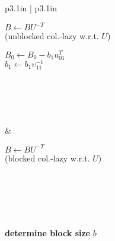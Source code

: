 \begin{figure}[htbp]
\begin{center}
\begin{tabular}{p{3.1in} | p{3.1in}}
\begin{minipage}{3.1in}
\begin{algorithm}{
\label{alg:unblocked_collazy_utrsm}
\begin{minipage}[t]{2in}
$ B \leftarrow B U^{-T} $ \\(unblocked col.-lazy w.r.t. $ U $)
\end{minipage}
}
\begin{minipage}{4in}
\begin{FlameAlgNarrow}
  $ B_0 \leftarrow B_0 -  b_{1} u_{01}^T $ \\
  $ b_{1} \leftarrow b_{1} \upsilon_{11}^{-1} $ \\
  
  \FlaEndCompute\\     %
   \\ 
   \\           %
\FlaEndDo \\       %
\end{FlameAlgNarrow}
\end{minipage}
\end{algorithm}
\end{minipage}
&
\begin{minipage}{3.1in}
\begin{algorithm}{
\label{alg:blocked_collazy_utrsm}
\begin{minipage}[t]{2in}
$ B \leftarrow BU^{-T} $ \\(blocked col.-lazy w.r.t. $ U $)
\end{minipage}
}
\\[0.2in]
\begin{minipage}{4in}
\begin{FlameAlgNarrow}
{
} \\
{
}
\\
 \\
   {\bf determine block size} $ b $ \\
  {
  } \\
\end{FlameAlgNarrow}
\end{minipage}
\end{algorithm}
\end{minipage}
\end{tabular}
\end{center}
\end{figure}
